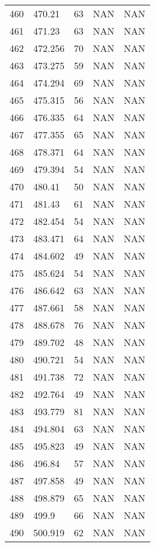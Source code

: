 \documentclass{article}
\begin{document}
\begin{longtable}{@{}lllll@{}}
				460 & 470.21  & 63    & NAN   & NAN   \\
				461 & 471.23  & 63    & NAN   & NAN   \\
				462 & 472.256 & 70    & NAN   & NAN   \\
				463 & 473.275 & 59    & NAN   & NAN   \\
				464 & 474.294 & 69    & NAN   & NAN   \\
				465 & 475.315 & 56    & NAN   & NAN   \\
				466 & 476.335 & 64    & NAN   & NAN   \\
				467 & 477.355 & 65    & NAN   & NAN   \\
				468 & 478.371 & 64    & NAN   & NAN   \\
				469 & 479.394 & 54    & NAN   & NAN   \\
				470 & 480.41  & 50    & NAN   & NAN   \\
				471 & 481.43  & 61    & NAN   & NAN   \\
				472 & 482.454 & 54    & NAN   & NAN   \\
				473 & 483.471 & 64    & NAN   & NAN   \\
				474 & 484.602 & 49    & NAN   & NAN   \\
				475 & 485.624 & 54    & NAN   & NAN   \\
				476 & 486.642 & 63    & NAN   & NAN   \\
				477 & 487.661 & 58    & NAN   & NAN   \\
				478 & 488.678 & 76    & NAN   & NAN   \\
				479 & 489.702 & 48    & NAN   & NAN   \\
				480 & 490.721 & 54    & NAN   & NAN   \\
				481 & 491.738 & 72    & NAN   & NAN   \\
				482 & 492.764 & 49    & NAN   & NAN   \\
				483 & 493.779 & 81    & NAN   & NAN   \\
				484 & 494.804 & 63    & NAN   & NAN   \\
				485 & 495.823 & 49    & NAN   & NAN   \\
				486 & 496.84  & 57    & NAN   & NAN   \\
				487 & 497.858 & 49    & NAN   & NAN   \\
				488 & 498.879 & 65    & NAN   & NAN   \\
				489 & 499.9   & 66    & NAN   & NAN   \\
				490 & 500.919 & 62    & NAN   & NAN   \\

\end{longtable}
\end{document}
